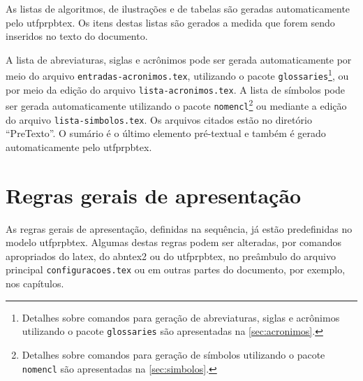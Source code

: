 As listas de algoritmos, de ilustrações e de tabelas são geradas automaticamente pelo \gls{utfprpbtex}. Os itens destas listas são gerados a medida que forem sendo inseridos no texto do documento.

A lista de abreviaturas, siglas e acrônimos pode ser gerada automaticamente por meio do arquivo \texttt{entradas-acronimos.tex}, utilizando o pacote \texttt{glossaries}\footnote{Detalhes sobre comandos para geração de abreviaturas, siglas e acrônimos utilizando o pacote \texttt{glossaries} são apresentadas na \autoref{sec:acronimos}.}, ou por meio da edição do arquivo \texttt{lista-acronimos.tex}. A lista de símbolos pode ser gerada automaticamente utilizando o pacote \texttt{nomencl}\footnote{Detalhes sobre comandos para geração de símbolos utilizando o pacote \texttt{nomencl} são apresentadas na \autoref{sec:simbolos}.} ou mediante a edição do arquivo \texttt{lista-simbolos.tex}. Os arquivos citados estão no diretório ``PreTexto''. O sumário é o último elemento pré-textual e também é gerado automaticamente pelo \gls{utfprpbtex}.

\section{Regras gerais de apresentação}\label{sec:regrasgerais}

As regras gerais de apresentação, definidas na sequência, já estão predefinidas no modelo \gls{utfprpbtex}. Algumas destas regras podem ser alteradas, por comandos apropriados do \gls{latex}, do \gls{abntex2} ou do \gls{utfprpbtex}, no preâmbulo do arquivo principal \texttt{configuracoes.tex} ou em outras partes do documento, por exemplo, nos capítulos.

